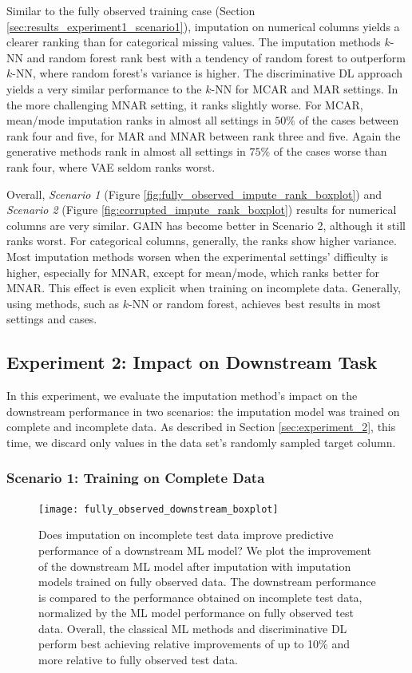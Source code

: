 \documentclass[utf8]{frontiersSCNS} %
\begin{document}
Similar to the fully observed training case (Section \ref{sec:results_experiment1_scenario1}), imputation on numerical columns yields a clearer ranking than for categorical missing values. The imputation methods $k$-NN and random forest rank best with a tendency of random forest to outperform $k$-NN, where random forest's variance is higher. The discriminative DL approach yields a very similar performance to the $k$-NN for MCAR and MAR settings. In the more challenging MNAR setting, it ranks slightly worse. For MCAR, mean/mode imputation ranks in almost all settings in $50\%$ of the cases between rank four and five, for MAR and MNAR between rank three and five. Again the generative methods rank in almost all settings in $75\%$ of the cases worse than rank four, where VAE seldom ranks worst.

Overall, \textit{Scenario 1} (Figure \ref{fig:fully_observed_impute_rank_boxplot}) and \textit{Scenario 2} (Figure \ref{fig:corrupted_impute_rank_boxplot}) results for numerical columns are very similar. GAIN has become better in Scenario 2, although it still ranks worst. For categorical columns, generally, the ranks show higher variance. Most imputation methods worsen when the experimental settings' difficulty is higher, especially for MNAR, except for mean/mode, which ranks better for MNAR. This effect is even explicit when training on incomplete data. Generally, using methods, such as $k$-NN or random forest, achieves best results in most settings and cases.



\subsection{Experiment 2: Impact on Downstream Task}

In this experiment, we evaluate the imputation method's impact on the downstream performance in two scenarios: the imputation model was trained on complete and incomplete data. As described in Section \ref{sec:experiment_2}, this time, we discard only values in the data set's randomly sampled target column.


\subsubsection{Scenario 1: Training on Complete Data}

\begin{figure}\centering
	\texttt{[image: fully\_observed\_downstream\_boxplot]}
	\caption{Does imputation on incomplete test data improve predictive performance of a downstream ML model? We plot the improvement of the downstream ML model after imputation with imputation models trained on fully observed data. The downstream performance is compared to the performance obtained on incomplete test data, normalized by the ML model performance on fully observed test data. Overall, the classical ML methods and discriminative DL perform best achieving relative improvements of up to 10\% and more relative to fully observed test data.
	}
	\label{fig:fully_observed_downstream_boxplot}
\end{figure}
\end{document}
